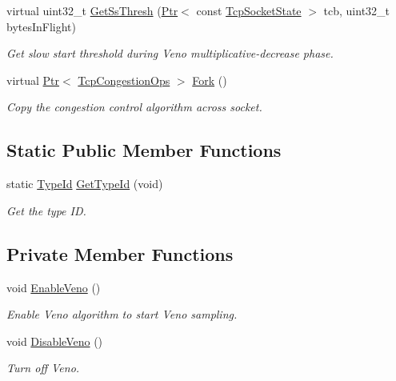 \begin{DoxyCompactItemize}
virtual uint32\+\_\+t \hyperlink{classns3_1_1TcpVeno_a03a169d4fd7653a6a56a7963578cc489}{Get\+Ss\+Thresh} (\hyperlink{classns3_1_1Ptr}{Ptr}$<$ const \hyperlink{classns3_1_1TcpSocketState}{Tcp\+Socket\+State} $>$ tcb, uint32\+\_\+t bytes\+In\+Flight)
\begin{DoxyCompactList}\small\item\em Get slow start threshold during Veno multiplicative-\/decrease phase. \end{DoxyCompactList}\item 
virtual \hyperlink{classns3_1_1Ptr}{Ptr}$<$ \hyperlink{classns3_1_1TcpCongestionOps}{Tcp\+Congestion\+Ops} $>$ \hyperlink{classns3_1_1TcpVeno_a32d40c4563a8ba8e0317b860c184c055}{Fork} ()
\begin{DoxyCompactList}\small\item\em Copy the congestion control algorithm across socket. \end{DoxyCompactList}\end{DoxyCompactItemize}
\subsection*{Static Public Member Functions}
\begin{DoxyCompactItemize}
\item 
static \hyperlink{classns3_1_1TypeId}{Type\+Id} \hyperlink{classns3_1_1TcpVeno_adb5c48263b4c12ac1e7715b1c5adc749}{Get\+Type\+Id} (void)
\begin{DoxyCompactList}\small\item\em Get the type ID. \end{DoxyCompactList}\end{DoxyCompactItemize}
\subsection*{Private Member Functions}
\begin{DoxyCompactItemize}
\item 
void \hyperlink{classns3_1_1TcpVeno_a7ece86eb87a0b29cb1d13be11a963873}{Enable\+Veno} ()
\begin{DoxyCompactList}\small\item\em Enable Veno algorithm to start Veno sampling. \end{DoxyCompactList}\item 
void \hyperlink{classns3_1_1TcpVeno_ad3c860be7664f91a2409145d6085da01}{Disable\+Veno} ()
\begin{DoxyCompactList}\small\item\em Turn off Veno. \end{DoxyCompactList}\end{DoxyCompactItemize}
